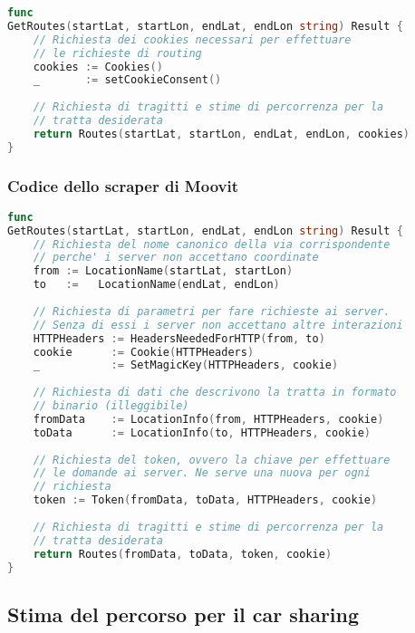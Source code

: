 \begin{lstlisting}[language=Go]
func
GetRoutes(startLat, startLon, endLat, endLon string) Result {
	// Richiesta dei cookies necessari per effettuare
	// le richieste di routing
	cookies := Cookies()
	_       := setCookieConsent()
	
	// Richiesta di tragitti e stime di percorrenza per la
	// tratta desiderata
	return Routes(startLat, startLon, endLat, endLon, cookies)
}
\end{lstlisting}

\pagebreak

\subsubsection{Codice dello scraper di Moovit}

\begin{lstlisting}[language=Go]
func
GetRoutes(startLat, startLon, endLat, endLon string) Result {
	// Richiesta del nome canonico della via corrispondente
	// perche' i server non accettano coordinate
	from := LocationName(startLat, startLon)
	to   :=   LocationName(endLat, endLon)
	
	// Richiesta di parametri per fare richieste ai server.
	// Senza di essi i server non accettano altre interazioni
	HTTPHeaders := HeadersNeededForHTTP(from, to)
	cookie      := Cookie(HTTPHeaders)
	_           := SetMagicKey(HTTPHeaders, cookie)
	
	// Richiesta di dati che descrivono la tratta in formato
	// binario (illeggibile)
	fromData    := LocationInfo(from, HTTPHeaders, cookie)
	toData      := LocationInfo(to, HTTPHeaders, cookie)
	
	// Richiesta del token, ovvero la chiave per effettuare
	// le domande ai server. Ne serve una nuova per ogni
	// richiesta
	token := Token(fromData, toData, HTTPHeaders, cookie)
	
	// Richiesta di tragitti e stime di percorrenza per la
	// tratta desiderata
	return Routes(fromData, toData, token, cookie)
}
\end{lstlisting}

\pagebreak

\subsection{Stima del percorso per il car sharing}

